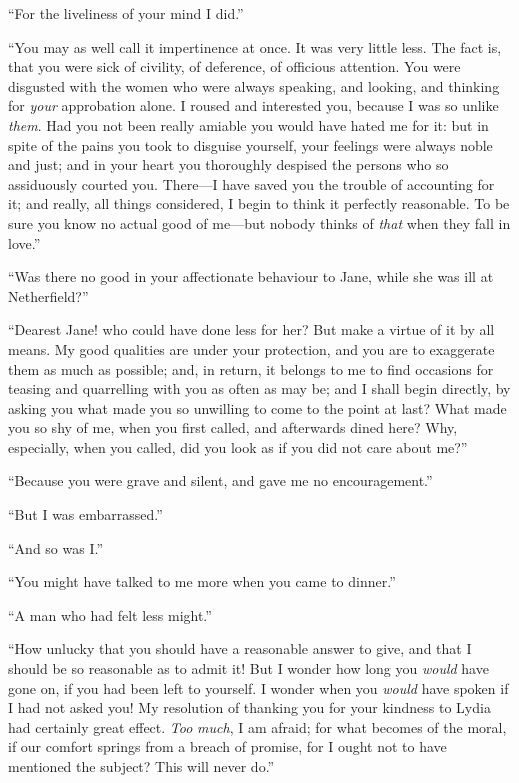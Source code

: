\documentclass[12pt,openright]{book}
\begin{document}
“For the liveliness of your mind I did.”

“You may as well call it impertinence at once. It was very little less. The fact is, that you were sick of civility, of deference, of officious attention. You were disgusted with the women who were always speaking, and looking, and thinking for \textit{your} approbation alone. I roused and interested you, because I was so unlike \textit{them}. Had you not been really amiable you would have hated me for it: but in spite of the pains you took to disguise yourself, your feelings were always noble and just; and in your heart you thoroughly despised the persons who so assiduously courted you. There—I have saved you the trouble of accounting for it; and really, all things considered, I begin to think it perfectly reasonable. To be sure you know no actual good of me—but nobody thinks of \textit{that} when they fall in love.”

“Was there no good in your affectionate behaviour to Jane, while she was ill at Netherfield?”

“Dearest Jane! who could have done less for her? But make a virtue of it by all means. My good qualities are under your protection, and you are to exaggerate them as much as possible; and, in return, it belongs to me to find occasions for teasing and quarrelling with you as often as may be; and I shall begin directly, by asking you what made you so unwilling to come to the point at last? What made you so shy of me, when you first called, and afterwards dined here? Why, especially, when you called, did you look as if you did not care about me?”

“Because you were grave and silent, and gave me no encouragement.”

“But I was embarrassed.”

“And so was I.”

“You might have talked to me more when you came to dinner.”

“A man who had felt less might.”

“How unlucky that you should have a reasonable answer to give, and that I should be so reasonable as to admit it! But I wonder how long you \textit{would} have gone on, if you had been left to yourself. I wonder when you \textit{would} have spoken if I had not asked you! My resolution of thanking you for your kindness to Lydia had certainly great effect. \textit{Too}\textit{ }\textit{much}, I am afraid; for what becomes of the moral, if our comfort springs from a breach of promise, for I ought not to have mentioned the subject? This will never do.”
\end{document}
